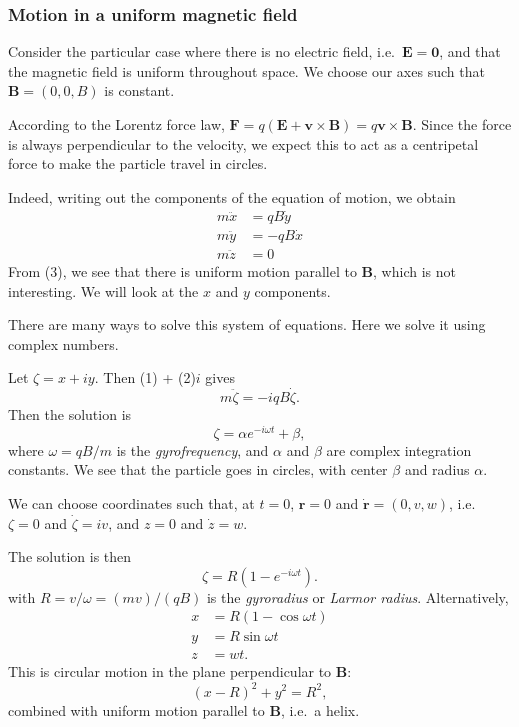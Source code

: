 \documentclass[a4paper]{article}
\begin{document}
\subsubsection*{Motion in a uniform magnetic field}
Consider the particular case where there is no electric field, i.e.\ $\mathbf{E} = \mathbf{0}$, and that the magnetic field is uniform throughout space. We choose our axes such that $\mathbf{B} = (0, 0, B)$ is constant.

According to the Lorentz force law, $\mathbf{F} = q(\mathbf{E} + \mathbf{v}\times \mathbf{B}) = q\mathbf{v}\times \mathbf{B}$. Since the force is always perpendicular to the velocity, we expect this to act as a centripetal force to make the particle travel in circles.

Indeed, writing out the components of the equation of motion, we obtain
\begin{align*}
  m\ddot{x} &= qB\dot{y}\tag{1}\\
  m\ddot{y} &= -qB\dot{x}\tag{2}\\
  m\ddot{z} &= 0\tag{3}
\end{align*}
From (3), we see that there is uniform motion parallel to $\mathbf{B}$, which is not interesting. We will look at the $x$ and $y$ components.

There are many ways to solve this system of equations. Here we solve it using complex numbers.

Let $\zeta = x + iy$. Then (1) + (2)$i$ gives
\[
  m\ddot{\zeta} = -iqB\dot{\zeta}.
\]
Then the solution is
\[
  \zeta = \alpha e^{-i\omega t} + \beta,
\]
where $\omega = qB/m$ is the \emph{gyrofrequency}, and $\alpha$ and $\beta$ are complex integration constants. We see that the particle goes in circles, with center $\beta$ and radius $\alpha$.

We can choose coordinates such that, at $t = 0$, $\mathbf{r} = 0$ and $\dot{\mathbf{r}} = (0, v, w)$, i.e.~$\zeta = 0$ and $\dot{\zeta} = iv$, and $z = 0$ and $\dot{z} = w$.

The solution is then
\[
  \zeta = R(1 - e^{-i\omega t}).
\]
with $R = v/\omega = (mv)/(qB)$ is the \emph{gyroradius} or \emph{Larmor radius}. Alternatively,
\begin{align*}
  x &= R(1 - \cos \omega t)\\
  y &= R\sin \omega t\\
  z &= wt.
\end{align*}
This is circular motion in the plane perpendicular to $\mathbf{B}$:
\[
  (x - R)^2 + y^2 = R^2,
\]
combined with uniform motion parallel to $\mathbf{B}$, i.e.~a helix.
\end{document}
